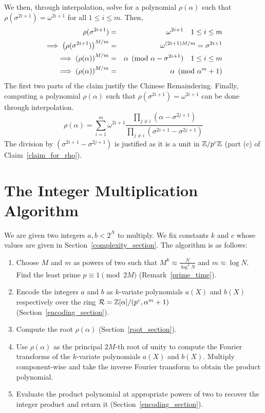 \documentclass[11pt]{article}
\renewcommand{\R}{\mathcal{R}} %
\begin{document}
We then, through interpolation, solve for a polynomial $\rho(\alpha)$
such that $\rho(\sigma^{2i+1}) = \omega^{2i+1}$ for all $1\leq i \leq
m$. Then,
\begin{eqnarray*}
  \rho(\sigma^{2i+1}) & = & \omega^{2i+1}\quad 1\leq i \leq m\\
  \implies   \left(\rho(\sigma^{2i+1})\right)^{M/m} & = &
  \omega^{(2i+1)M/m} = \sigma^{2i+1}\\
  \implies \left(\rho(\alpha)\right)^{M/m} & = & \alpha \pmod{\alpha -
    \sigma^{2i+1}}\quad 1\leq i \leq m\\
  \implies \left(\rho(\alpha)\right)^{M/m} & = & \alpha \pmod{ \alpha^m +
    1}
\end{eqnarray*}
The first two parts of the claim justify the Chinese
Remaindering. Finally, computing a polynomial $\rho(\alpha)$ such that
$\rho(\sigma^{2i+1}) = \omega^{2i+1}$ can be done through
interpolation.
$$
\rho(\alpha) = \sum_{i=1}^{m}\omega^{2i+1}\frac{\prod_{j\neq i}(\alpha
  - \sigma^{2j+1})}{\prod_{j\neq i}(\sigma^{2i+1} - \sigma^{2j+1})}
$$ The division by $(\sigma^{2i+1} - \sigma^{2j+1})$ is justified as
it is a unit in $\mathbb{Z}/p^c\mathbb{Z}$ (part (c) of Claim~\ref{claim_for_rho}).

\section{The Integer Multiplication Algorithm}\label{intmult_section}

We are given two integers $a,b< 2^N$ to multiply. We fix constants $k$
and $c$  whose values are given in
Section~\ref{complexity_section}. The algorithm is as follows:
\begin{enumerate}
\item Choose $M$ and $m$ as powers of two such that $M^k \approx
  \frac{N}{\log^2N}$ and $m \approx \log N$. Find the
  least prime $p\equiv 1\pmod{2M}$ (Remark~\ref{prime_time}).
\item Encode the integers $a$ and $b$ as $k$-variate polynomials
  $a(X)$ and $b(X)$ respectively over the ring $\R = \Z[\alpha]/(p^c,
  \alpha^m + 1)$ (Section~\ref{encoding_section}).
\item Compute the root $\rho(\alpha)$ (Section~\ref{root_section}).
\item Use $\rho(\alpha)$ as the principal $2M$-th root of unity to
  compute the Fourier transforms of the $k$-variate polynomials $a(X)$
  and $b(X)$. Multiply component-wise and take the inverse Fourier
  transform to obtain the product polynomial.
\item Evaluate the product polynomial at appropriate powers of two to
  recover the integer product and return it
  (Section~\ref{encoding_section}).
\end{enumerate}
\end{document}
